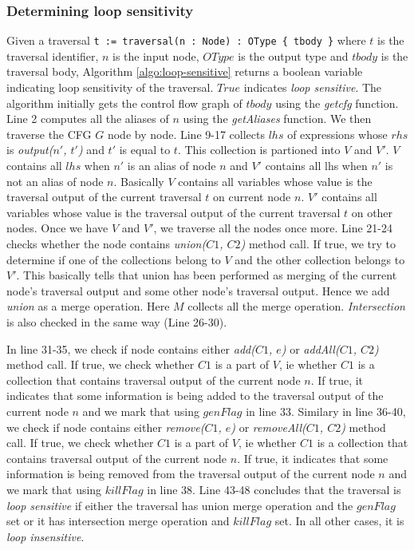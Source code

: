 \subsubsection{Determining loop sensitivity}
\label{sec:determine-loop}
Given a traversal \texttt{t := traversal(n : Node) : OType \{ tbody \}} where $t$ is the traversal identifier, $n$ is the input node, $OType$ is the output type and $tbody$ is the traversal body, Algorithm \ref{algo:loop-sensitive} returns a boolean variable indicating loop sensitivity of the traversal. $True$ indicates \textit{loop sensitive}. The algorithm initially gets the control flow graph of $tbody$ using the \textit{getcfg} function. Line 2 computes all the aliases of $n$ using the \textit{getAliases} function. We then traverse the CFG $G$ node by node. Line 9-17 collects $lhs$ of expressions whose $rhs$ is \textit{output($n'$, $t'$)} and $t'$ is equal to $t$. This collection is partioned into $V$ and $V'$. $V$ contains all $lhs$ when $n'$ is an alias of node $n$ and $V'$ contains all lhs when $n'$ is not an alias of node $n$. Basically $V$ contains all variables whose value is the traversal output of the current traversal $t$ on current node $n$. $V'$ contains all variables whose value is the traversal output of the current traversal $t$ on other nodes. Once we have $V$ and $V'$, we traverse all the nodes once more. Line 21-24 checks whether the node contains \textit{union($C1$, $C2$)} method call. If true, we try to determine if one of the collections belong to $V$  and the other collection belongs to $V'$. This basically tells that union has been performed as merging of the current node's traversal output and some other node's traversal output. Hence we add \textit{union} as a merge operation. Here $M$ collects all the merge operation. \textit{Intersection} is also checked in the same way (Line 26-30).\par 
In line 31-35, we check if node contains either \textit{add($C1$, $e$)} or \textit{addAll($C1$, $C2$)} method call. If true, we check whether $C1$ is a part of $V$, ie whether $C1$ is a collection that contains traversal output of the current node $n$. If true, it indicates that some information is being added to the traversal output of the current node $n$ and we mark that using $genFlag$ in line 33. Similary in line 36-40, we check if node contains either \textit{remove($C1$, $e$)} or \textit{removeAll($C1$, $C2$)} method call. If true, we check whether $C1$ is a part of $V$, ie whether $C1$ is a collection that contains traversal output of the current node $n$. If true, it indicates that some information is being removed from the traversal output of the current node $n$ and we mark that using $killFlag$ in line 38. 
Line 43-48 concludes that the traversal is \textit{loop sensitive} if either the traversal has union merge operation and the $genFlag$ set or it has intersection merge operation and $killFlag$ set. In all other cases, it is \textit{loop insensitive}.

